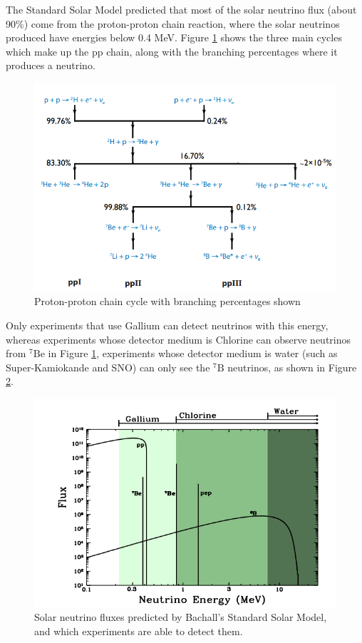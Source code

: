 The Standard Solar Model predicted that most of the solar neutrino flux (about 90\%) come from the proton-proton chain reaction, where the solar neutrinos produced have energies below 0.4 MeV. Figure \ref{fig:ppchain} shows the three main cycles which make up the pp chain, along with the branching percentages where it produces a neutrino. 

\begin{figure}
    \includegraphics[width=\textwidth]{Figures/ppchain.png}
    \caption{Proton-proton chain cycle with branching percentages shown}
    \label{fig:ppchain}
\end{figure}

Only experiments that use Gallium can detect neutrinos with this energy, whereas experiments whose detector medium is Chlorine can observe neutrinos from ${ }^{7} \mathrm{Be}$ in Figure \ref{fig:ppchain}, experiments whose detector medium is water (such as Super-Kamiokande and SNO) can only see the ${ }^{7} \mathrm{B}$ neutrinos, as shown in Figure \ref{fig:nu_energy_bachall}.

\begin{figure}
    \includegraphics[width=\textwidth]{Figures/nu_energy_bachall.png}
    \caption{Solar neutrino fluxes predicted by Bachall's Standard Solar Model, and which experiments are able to detect them.}
    \label{fig:nu_energy_bachall}
\end{figure}

